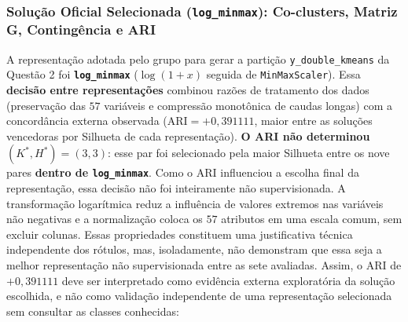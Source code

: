 \documentclass[a4paper,11pt]{article}
\begin{document}
\subsubsection{\texorpdfstring{Solução Oficial Selecionada (\texttt{log\_minmax}): Co-clusters, Matriz G, Contingência e ARI}{Solução Oficial Selecionada (logminmax): Co-clusters, Matriz G, Contingência e ARI}}\label{sec:2-1-5-solucao-oficial-selecionada-logminmax-co-clusters-matriz-g-contingencia-e-ari}


A representação adotada pelo grupo para gerar a partição \texttt{y\_\allowbreak double\_\allowbreak kmeans} da Questão 2 foi \textbf{\texttt{log\_\allowbreak minmax}} ($\log(1+x)$ seguida de \texttt{MinMaxScaler}). Essa \textbf{decisão entre representações} combinou razões de tratamento dos dados (preservação das $57$ variáveis e compressão monotônica de caudas longas) com a concordância externa observada ($\text{ARI}=+0,391111$, maior entre as soluções vencedoras por Silhueta de cada representação). \textbf{O ARI não determinou $(K^*,H^*)=(3,3)$}: esse par foi selecionado pela maior Silhueta entre os nove pares \textbf{dentro de \texttt{log\_\allowbreak minmax}}. Como o ARI influenciou a escolha final da representação, essa decisão não foi inteiramente não supervisionada. A transformação logarítmica reduz a influência de valores extremos nas variáveis não negativas e a normalização coloca os $57$ atributos em uma escala comum, sem excluir colunas. Essas propriedades constituem uma justificativa técnica independente dos rótulos, mas, isoladamente, não demonstram que essa seja a melhor representação não supervisionada entre as sete avaliadas. Assim, o ARI de $+0,391111$ deve ser interpretado como evidência externa exploratória da solução escolhida, e não como validação independente de uma representação selecionada sem consultar as classes conhecidas:
\end{document}
